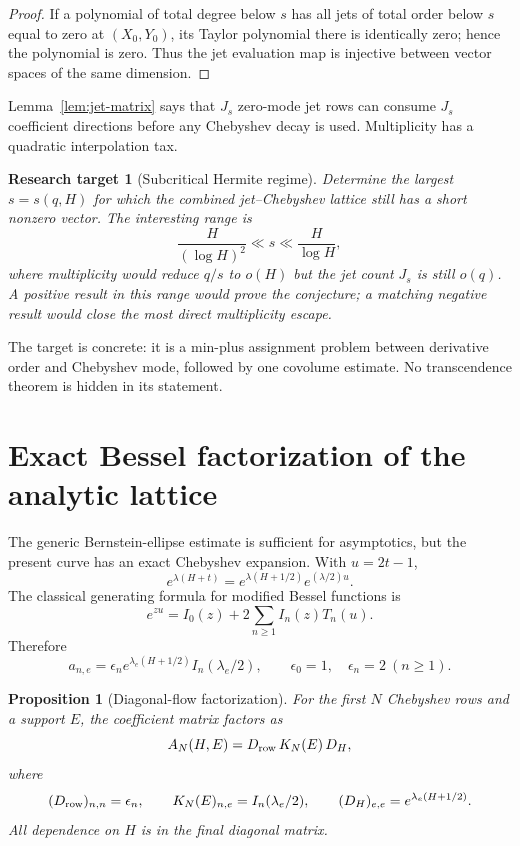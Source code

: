 \documentclass[11pt,oneside]{article}
\newtheorem{proposition}[theorem]{Proposition}
\newtheorem{target}[theorem]{Research target}
\theoremstyle{definition}
\theoremstyle{remark}
\begin{document}
\begin{proof}
If a polynomial of total degree below $s$ has all jets of total order below $s$ equal to zero
at $(X_0,Y_0)$, its Taylor polynomial there is identically zero; hence the polynomial is zero.
Thus the jet evaluation map is injective between vector spaces of the same dimension.
\end{proof}

Lemma~\ref{lem:jet-matrix} says that $J_s$ zero-mode jet rows can consume $J_s$ coefficient
directions before any Chebyshev decay is used.  Multiplicity has a quadratic interpolation
tax.

\begin{target}[Subcritical Hermite regime]
\label{target:subcritical-hermite}
Determine the largest $s=s(q,H)$ for which the combined jet--Chebyshev lattice still has a
short nonzero vector.  The interesting range is
\[
 \frac{H}{(\log H)^2}\ll s\ll\frac{H}{\log H},
\]
where multiplicity would reduce $q/s$ to $o(H)$ but the jet count
$J_s$ is still $o(q)$.  A positive result in this range would prove the conjecture; a matching
negative result would close the most direct multiplicity escape.
\end{target}

The target is concrete: it is a min-plus assignment problem between derivative order and
Chebyshev mode, followed by one covolume estimate.  No transcendence theorem is hidden in its
statement.

\section{Exact Bessel factorization of the analytic lattice}
\label{sec:bessel}

The generic Bernstein-ellipse estimate is sufficient for asymptotics, but the present curve
has an exact Chebyshev expansion.  With $u=2t-1$,
\[
 e^{\lambda(H+t)}=e^{\lambda(H+1/2)}e^{(\lambda/2)u}.
\]
The classical generating formula for modified Bessel functions is
\begin{equation}
 e^{zu}=I_0(z)+2\sum_{n\ge1}I_n(z)T_n(u).
 \label{eq:bessel-cheb}
\end{equation}
Therefore
\begin{equation}
 a_{n,e}=\epsilon_n e^{\lambda_e(H+1/2)}I_n(\lambda_e/2),
 \qquad
 \epsilon_0=1,\quad\epsilon_n=2\ (n\ge1).
 \label{eq:exact-cheb-coeff}
\end{equation}

\begin{proposition}[Diagonal-flow factorization]
\label{prop:bessel-factorization}
For the first $N$ Chebyshev rows and a support $E$, the coefficient matrix factors as
\begin{equation}
 A_N(H,E)=D_{\rm row}\,K_N(E)\,D_H,
 \label{eq:bessel-factorization}
\end{equation}
where
\[
 (D_{\rm row})_{n,n}=\epsilon_n,
 \qquad
 K_N(E)_{n,e}=I_n(\lambda_e/2),
 \qquad
 (D_H)_{e,e}=e^{\lambda_e(H+1/2)}.
\]
All dependence on $H$ is in the final diagonal matrix.
\end{proposition}
\end{document}
